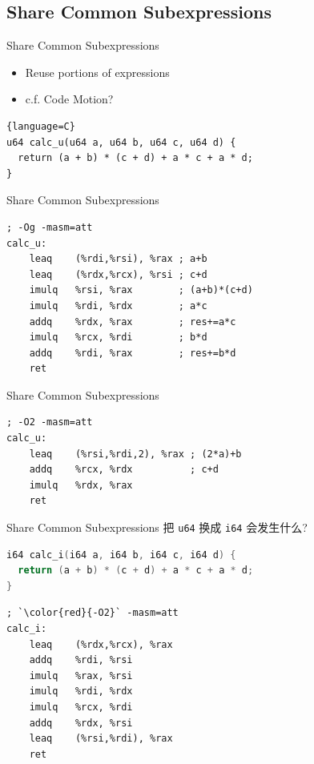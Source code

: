 ﻿\documentclass{ctexbeamer}
\begin{document}
\subsection{Share Common Subexpressions}

\begin{frame}[fragile]{Share Common Subexpressions}
  \begin{itemize}
    \item Reuse portions of expressions
    \item c.f. Code Motion?
  \end{itemize}

  \begin{lstlisting}{language=C}
u64 calc_u(u64 a, u64 b, u64 c, u64 d) {
  return (a + b) * (c + d) + a * c + a * d;
}
  \end{lstlisting}
\end{frame}

\begin{frame}{Share Common Subexpressions}
  \begin{lstlisting}[language=x86_64]
; -Og -masm=att
calc_u:
    leaq    (%rdi,%rsi), %rax ; a+b
    leaq    (%rdx,%rcx), %rsi ; c+d
    imulq   %rsi, %rax        ; (a+b)*(c+d)
    imulq   %rdi, %rdx        ; a*c
    addq    %rdx, %rax        ; res+=a*c
    imulq   %rcx, %rdi        ; b*d
    addq    %rdi, %rax        ; res+=b*d
    ret
  \end{lstlisting}
\end{frame}

\begin{frame}{Share Common Subexpressions}
  \begin{lstlisting}[language=x86_64]
; -O2 -masm=att
calc_u:
    leaq    (%rsi,%rdi,2), %rax ; (2*a)+b
    addq    %rcx, %rdx          ; c+d
    imulq   %rdx, %rax
    ret
  \end{lstlisting}
\end{frame}

\begin{frame}[fragile]{Share Common Subexpressions}
  \qquad 把 \texttt{u64} 换成 \texttt{i64} 会发生什么?

  \begin{lstlisting}[language=C]
i64 calc_i(i64 a, i64 b, i64 c, i64 d) {
  return (a + b) * (c + d) + a * c + a * d;
}
  \end{lstlisting}

  \pause
  \begin{lstlisting}[language=x86_64]
; `\color{red}{-O2}` -masm=att
calc_i:
    leaq    (%rdx,%rcx), %rax
    addq    %rdi, %rsi
    imulq   %rax, %rsi
    imulq   %rdi, %rdx
    imulq   %rcx, %rdi
    addq    %rdx, %rsi
    leaq    (%rsi,%rdi), %rax
    ret
  \end{lstlisting}
\end{frame}
\end{document}
